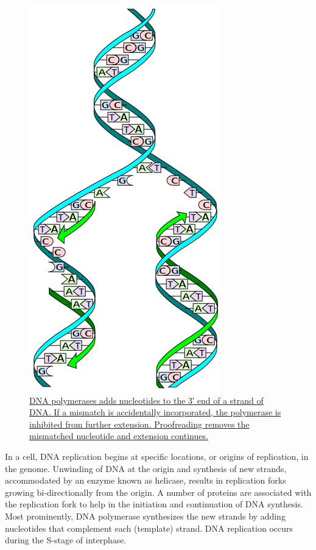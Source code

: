 \begin{figure}

{\centering \includegraphics[width=0.7\linewidth]{./figures/replication/DNA_replication_split} 

}

\caption{\href{https://commons.wikimedia.org/wiki/File:DNA_replication_split.svg}{DNA polymerases adds nucleotides to the 3′ end of a strand of DNA. If a mismatch is accidentally incorporated, the polymerase is inhibited from further extension. Proofreading removes the mismatched nucleotide and extension continues.}}\label{fig:repfork}
\end{figure}

In a cell, DNA replication begins at specific locations, or origins of replication, in the genome. Unwinding of DNA at the origin and synthesis of new strands, accommodated by an enzyme known as helicase, results in replication forks growing bi-directionally from the origin. A number of proteins are associated with the replication fork to help in the initiation and continuation of DNA synthesis. Most prominently, DNA polymerase synthesizes the new strands by adding nucleotides that complement each (template) strand. DNA replication occurs during the S-stage of interphase.

